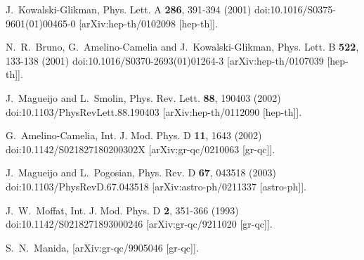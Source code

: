\documentclass[jkps,preprint,fleqn]{revtex4} %
\begin{document}
\begin{thebibliography}{999}
J.~Kowalski-Glikman,
Phys. Lett. A \textbf{286}, 391-394 (2001)
doi:10.1016/S0375-9601(01)00465-0
[arXiv:hep-th/0102098 [hep-th]].

N.~R.~Bruno, G.~Amelino-Camelia and J.~Kowalski-Glikman,
Phys. Lett. B \textbf{522}, 133-138 (2001)
doi:10.1016/S0370-2693(01)01264-3
[arXiv:hep-th/0107039 [hep-th]].


J.~Magueijo and L.~Smolin,
Phys. Rev. Lett. \textbf{88}, 190403 (2002)
doi:10.1103/PhysRevLett.88.190403
[arXiv:hep-th/0112090 [hep-th]].

G.~Amelino-Camelia,
Int. J. Mod. Phys. D \textbf{11}, 1643 (2002)
doi:10.1142/S021827180200302X
[arXiv:gr-qc/0210063 [gr-qc]].

J.~Magueijo and L.~Pogosian,
Phys. Rev. D \textbf{67}, 043518 (2003)
doi:10.1103/PhysRevD.67.043518
[arXiv:astro-ph/0211337 [astro-ph]].



J.~W.~Moffat,
Int. J. Mod. Phys. D \textbf{2}, 351-366 (1993)
doi:10.1142/S0218271893000246
[arXiv:gr-qc/9211020 [gr-qc]].

S.~N.~Manida,
[arXiv:gr-qc/9905046 [gr-qc]].


\end{thebibliography}
\end{document}
